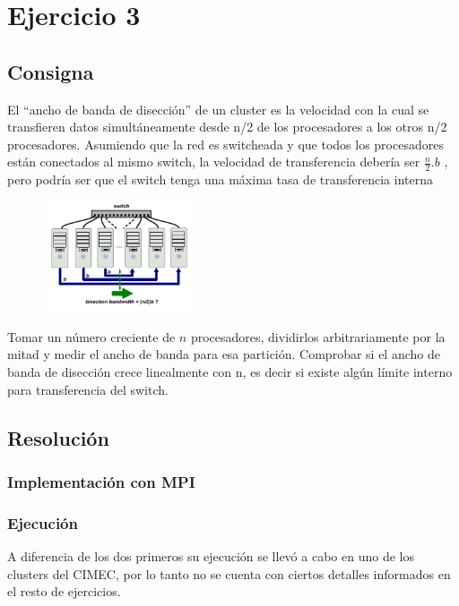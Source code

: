 \graphicspath{{Images/}}

\section{Ejercicio 3}

\subsection{Consigna}
El “ancho de banda de disección” de un cluster es la velocidad con la cual se transfieren datos simultáneamente desde n/2 de los procesadores a los otros n/2 procesadores. Asumiendo que la red es switcheada y que todos los procesadores están conectados al mismo switch, la velocidad de transferencia debería ser $\frac{n}{2}.b$ , pero podría ser que el switch tenga una máxima tasa de transferencia interna


\begin{figure}[h]
    \centering
    \includegraphics[width=0.40\textwidth]{Images/ej3.png}
\end{figure}

Tomar un número creciente de $n$ procesadores, dividirlos arbitrariamente por la mitad y medir el ancho de banda para esa partición. Comprobar si el ancho de banda de disección crece linealmente con n, es decir si existe algún límite interno para transferencia del switch.

\subsection{Resolución}
\subsubsection{Implementación con MPI}


\subsubsection{Ejecución}
A diferencia de los dos primeros su ejecución se llevó a cabo en uno de los clusters del CIMEC, por lo tanto no se cuenta con ciertos detalles informados en el resto de ejercicios.

